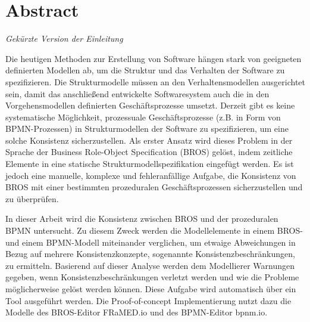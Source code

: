 \chapter*{Abstract}

\textit{Gekürzte Version der Einleitung}
\vspace{10pt}

Die heutigen Methoden zur Erstellung von Software hängen stark von geeigneten definierten Modellen ab, um die Struktur und das Verhalten der Software zu spezifizieren.
Die Strukturmodelle müssen an den Verhaltensmodellen ausgerichtet sein, damit das anschließend entwickelte Softwaresystem auch die in den Vorgehensmodellen definierten Geschäftsprozesse umsetzt.
Derzeit gibt es keine systematische Möglichkeit, prozessuale Geschäftsprozesse (z.B. in Form von BPMN-Prozessen) in Strukturmodellen der Software zu spezifizieren, um eine solche Konsistenz sicherzustellen.
Als erster Ansatz wird dieses Problem in der Sprache der Business Role-Object Specification (BROS) gelöst, indem zeitliche Elemente in eine statische Strukturmodellspezifikation eingefügt werden.
Es ist jedoch eine manuelle, komplexe und fehleranfällige Aufgabe, die Konsistenz von BROS mit einer bestimmten prozeduralen Geschäftsprozessen sicherzustellen und zu überprüfen.

In dieser Arbeit wird die Konsistenz zwischen BROS und der prozeduralen BPMN untersucht.
Zu diesem Zweck werden die Modellelemente in einem BROS- und einem BPMN-Modell miteinander verglichen, um etwaige Abweichungen in Bezug auf mehrere Konsistenzkonzepte, sogenannte Konsistenzbeschränkungen, zu ermitteln.
Basierend auf dieser Analyse werden dem Modellierer Warnungen gegeben, wenn Konsistenzbeschränkungen verletzt werden und wie die Probleme möglicherweise gelöst werden können.
Diese Aufgabe wird automatisch über ein Tool ausgeführt werden. Die Proof-of-concept Implementierung nutzt dazu die Modelle des BROS-Editor FRaMED.io und des BPMN-Editor bpnm.io.
